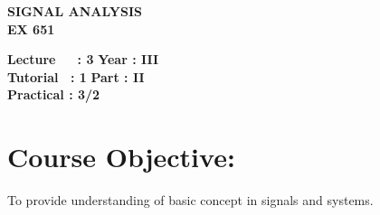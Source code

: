 \begin{center}
    \textbf{\huge{\uppercase{Signal Analysis}}}
    \\
    \vspace{.5cm}
    \textbf{\large{EX 651}}
\end{center}

\noindent\textbf{Lecture\ \ \ : 3} \hfill \textbf{Year : III} \\
\textbf{Tutorial \ : 1} \hfill \textbf{Part : II } \\
\textbf{Practical : 3/2}  \\

\par
\noindent 
\section*{Course Objective:}
To provide understanding of basic concept in signals and systems.



